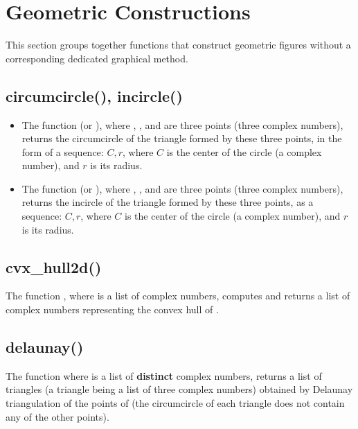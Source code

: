 \section{Geometric Constructions}

This section groups together functions that construct geometric figures without a corresponding dedicated graphical method.

\subsection{circumcircle(), incircle()}

\begin{itemize}
    \item The function  (or ), where , , and  are three points (three complex numbers), returns the circumcircle of the triangle formed by these three points, in the form of a sequence: $C,r$, where $C$ is the center of the circle (a complex number), and $r$ is its radius.

    \item The function  (or ), where , , and  are three points (three complex numbers), returns the incircle of the triangle formed by these three points, as a sequence: $C,r$, where $C$ is the center of the circle (a complex number), and $r$ is its radius.
\end{itemize}

\subsection{cvx\_hull2d()}

The function , where  is a list of complex numbers, computes and returns a list of complex numbers representing the convex hull of .

\subsection{delaunay()}

The function  where  is a list of \textbf{distinct} complex numbers, returns a list of triangles (a triangle being a list of three complex numbers) obtained by Delaunay triangulation of the points of  (the circumcircle of each triangle does not contain any of the other points).


